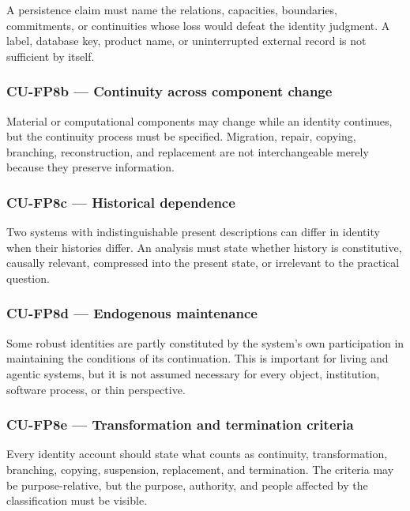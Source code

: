 \documentclass[
  11pt,
]{article}
\begin{document}
A persistence claim must name the relations, capacities, boundaries,
commitments, or continuities whose loss would defeat the identity
judgment. A label, database key, product name, or uninterrupted external
record is not sufficient by itself.

\subsubsection{CU-FP8b --- Continuity across component
change}\label{cu-fp8b-continuity-across-component-change}

Material or computational components may change while an identity
continues, but the continuity process must be specified. Migration,
repair, copying, branching, reconstruction, and replacement are not
interchangeable merely because they preserve information.

\subsubsection{CU-FP8c --- Historical
dependence}\label{cu-fp8c-historical-dependence}

Two systems with indistinguishable present descriptions can differ in
identity when their histories differ. An analysis must state whether
history is constitutive, causally relevant, compressed into the present
state, or irrelevant to the practical question.

\subsubsection{CU-FP8d --- Endogenous
maintenance}\label{cu-fp8d-endogenous-maintenance}

Some robust identities are partly constituted by the system's own
participation in maintaining the conditions of its continuation. This is
important for living and agentic systems, but it is not assumed
necessary for every object, institution, software process, or thin
perspective.

\subsubsection{CU-FP8e --- Transformation and termination
criteria}\label{cu-fp8e-transformation-and-termination-criteria}

Every identity account should state what counts as continuity,
transformation, branching, copying, suspension, replacement, and
termination. The criteria may be purpose-relative, but the purpose,
authority, and people affected by the classification must be visible.
\end{document}
